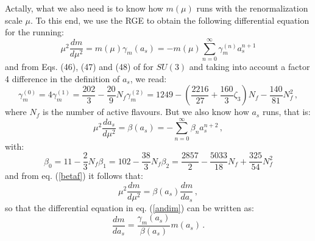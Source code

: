 \documentclass[10pt,a4paper]{article}
\begin{document}
Actally, what we also need is to know how $m(\mu)$ runs with the renormalization scale $\mu$. To this end, we use the RGE to obtain the following differential equation for the running:
\begin{equation}
\mu^2\frac{dm}{d\mu^2} = m(\mu)\gamma_m(a_s) =
-m(\mu)\sum_{n=0}^{\infty}\gamma_m^{(n)}a_s^{n+1}
\label{andim}
\end{equation}
and from Eqs. (46), (47) and (48) of \cite{Chetyrkin:1999pq} for $SU(3)$ and taking into account a factor 4 difference in the definition of $a_s$, we read:
\begin{subequations} 
\begin{equation}
\gamma_m^{(0)} = 4 
\end{equation}
\begin{equation}
\gamma_m^{(1)} = \frac{202}3 - \frac{20}{9}N_f
\end{equation}
\begin{equation}
\gamma_m^{(2)} = 1249 - \left(\frac{2216}{27}+\frac{160}{3}\zeta_3\right)N_f-\frac{140}{81}N_f^2\,,
\end{equation}
\end{subequations} 
where $N_f$ is the number of active flavours. But we also know how $a_s$ runs, that is:
\begin{equation}
\mu^2\frac{da_s}{d\mu^2} = \beta(a_s) = -\sum_{n=0}^{\infty}\beta_n
a_s^{n+2}\,,
\label{betaf}
\end{equation}
with:
\begin{subequations} 
\begin{equation}
\beta_0 = 11-\frac23 N_f 
\end{equation}
\begin{equation}
\beta_1 = 102 - \frac{38}3 N_f
\end{equation}
\begin{equation}
\beta_2 = \frac{2857}{2} - \frac{5033}{18}N_f + \frac{325}{54}N_f^2
\end{equation}
\end{subequations} 
and from eq. (\ref{betaf}) it follows that:
\begin{equation}
\mu^2\frac{dm}{d\mu^2} = \beta(a_s)\frac{d m}{da_s}\,,
\end{equation}
so that the differential equation in eq. (\ref{andim}) can be written as:
\begin{equation}
\frac{dm}{da_s} = \frac{\gamma_m(a_s)}{\beta(a_s)}m(a_s)\,.
\label{runmass}
\end{equation}
\end{document}

